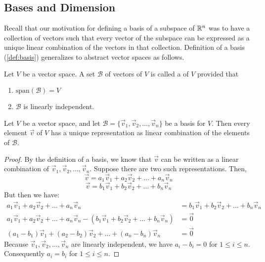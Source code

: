 \documentclass{ximera}
\begin{document}
\subsection*{Bases and Dimension}

Recall that our motivation for defining a basis of a subspace of $\mathbb{R}^n$ was to have a collection of vectors such that every vector of the subspace can be expressed as a unique linear combination of the vectors in that collection.  Definition of a basis (\ref{def:basis}) generalizes to abstract vector spaces as follows.

\begin{definition}\label{def:basisabstract}
Let $V$ be a vector space.  A set $\mathcal{B}$ of vectors of $V$ is called a  of $V$ provided that 
\begin{enumerate}
\item \label{item:defbasis1abstract}
$\mbox{span}(\mathcal{B})=V$ 
\item \label{item:defbasis2abstract}
$\mathcal{B}$ is linearly independent.
\end{enumerate}
\end{definition}

\begin{theorem}\label{th:uniquerep}
Let $V$ be a vector space, and let $\mathcal{B}=\{\vec{v}_1, \vec{v}_2,\ldots,\vec{v}_n\}$ be a basis for $V$.  Then every element $\vec{v}$ of $V$ has a unique representation as linear combination of the elements of $\mathcal{B}$.
\end{theorem}
\begin{proof}
By the definition of a basis, we know that $\vec{v}$ can be written as a linear combination of $\vec{v}_1, \vec{v}_2,\ldots,\vec{v}_n$.  Suppose there are two such representations.  Then,
$$\vec{v}=a_1\vec{v}_1+ a_2\vec{v}_2+\ldots+a_n\vec{v}_n$$
$$\vec{v}=b_1\vec{v}_1+ b_2\vec{v}_2+\ldots+b_n\vec{v}_n$$
But then we have:
\begin{align*}
a_1\vec{v}_1+ a_2\vec{v}_2+\ldots+a_n\vec{v}_n&=b_1\vec{v}_1+ b_2\vec{v}_2+\ldots+b_n\vec{v}_n\\
a_1\vec{v}_1+ a_2\vec{v}_2+\ldots+a_n\vec{v}_n-(b_1\vec{v}_1+ b_2\vec{v}_2+\ldots+b_n\vec{v}_n)&=\vec{0}\\
(a_1-b_1)\vec{v}_1+ (a_2-b_2)\vec{v}_2+\ldots+(a_n-b_n)\vec{v}_n&=\vec{0}
\end{align*}
Because $\vec{v}_1, \vec{v}_2,\ldots,\vec{v}_n$ are linearly independent, we have $a_i-b_i=0$ for $1\leq i\leq n$. Consequently $a_i=b_i$ for $1\leq i\leq n$.
\end{proof}
\end{document}
